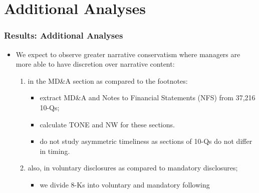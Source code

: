 \documentclass{beamer}
\begin{document}
\section{Additional Analyses}
\begin{frame}
\frametitle{Results: Additional Analyses}
\begin{itemize}
	\item We expect to observe greater narrative conservatism where managers are more able to have discretion over narrative content:
	\begin{enumerate}
		\item in the MD\&A section as compared to the footnotes:
		\begin{itemize}
			\item extract MD\&A and Notes to Financial Statements (NFS) from 37,216 10-Qs;
			\item calculate TONE and NW for these sections.
			\item do not study asymmetric timeliness as sections of 10-Qs do not differ in timing. \pause
		\end{itemize}
		\item also, in voluntary disclosures as compared to mandatory disclosures;
			\begin{itemize}
	\item we divide 8-Ks into voluntary and mandatory following \cite{lermanNewForm8K2010, heMeasuringDisclosureUsing2020}
			\end{itemize}
	\end{enumerate}
\end{itemize}
\end{frame}
\end{document}
